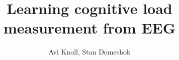 \documentclass[a4paper,10pt]{article}
\title{Learning cognitive load measurement from EEG}
\author{Avi Knoll, Stan Domeshok}
\begin{document}
\maketitle

\tableofcontents

{}

\end{document}
